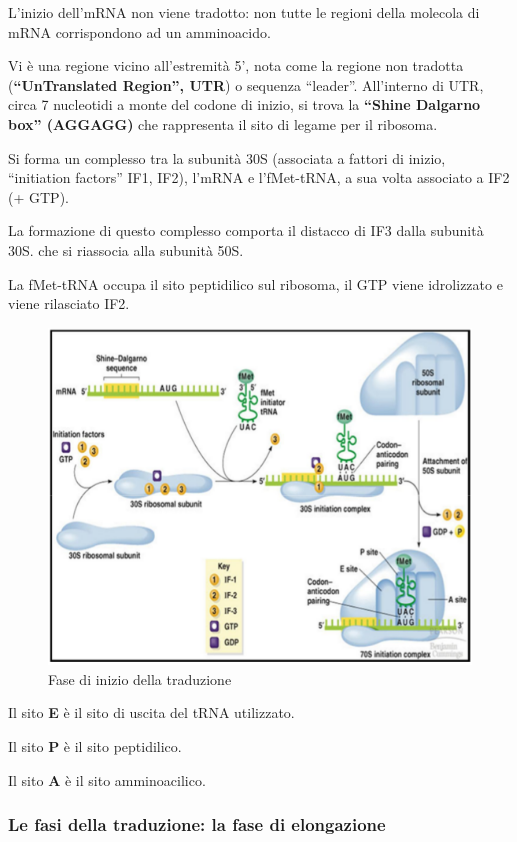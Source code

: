 \documentclass[11pt]{book}
\begin{document}
L’inizio dell'mRNA non viene tradotto: non tutte le regioni della molecola di mRNA corrispondono ad un amminoacido. 

Vi è una regione vicino all'estremità 5', nota come la regione non tradotta (\textbf{``UnTranslated Region'', UTR}) o sequenza ``leader''. All’interno di UTR, circa 7 nucleotidi a monte del codone di inizio, si trova la \textbf{``Shine Dalgarno box'' (AGGAGG)} che rappresenta il sito di legame per il ribosoma. 

Si forma un complesso tra la subunità 30S (associata a fattori di inizio, ``initiation factors'' IF1, IF2), l’mRNA e l’fMet-tRNA, a sua volta associato a IF2 (+ GTP).

La formazione di questo complesso comporta il distacco di IF3 dalla subunità 30S. che si riassocia alla subunità 50S. 

La fMet-tRNA occupa il sito peptidilico sul ribosoma, il GTP viene idrolizzato e viene rilasciato IF2.

\clearpage
\begin{figure}[htp]
\centering
\includegraphics[scale=0.6]{img/Inizio traduzione.png}
\caption{Fase di inizio della traduzione}
\label{}
\end{figure}

Il sito \textbf{E} è il sito di uscita del tRNA utilizzato.

Il sito \textbf{P} è il sito peptidilico.

Il sito \textbf{A} è il sito amminoacilico.


\subsubsection{Le fasi della traduzione: la fase di elongazione} 
\end{document}
